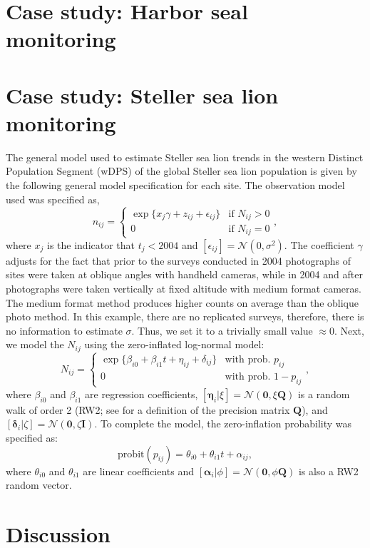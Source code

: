 \documentclass[12pt,letter]{article}
\newcommand{\Nij}{\ensuremath{N_{ij}}}
\newcommand{\fN}{\ensuremath{\mathcal{N}}}
\begin{document}
 


\section{Case study: Harbor seal monitoring}

\section{Case study: Steller sea lion monitoring}

The general model used to estimate Steller sea lion trends in the western Distinct Population Segment (wDPS) of the global Steller sea lion population is given by the following general model specification for each site. The observation model used was specified as,
\begin{equation}
n_{ij} = \left\{
	\begin{array}{ll} 
	\exp\{x_j \gamma + z_{ij} + \epsilon_{ij}\}& \mbox{if } N_{ij}>0\\
	0 & \mbox{if } N_{ij}=0
	\end{array}\right.,
\end{equation}
where $x_j$ is the indicator that $t_j < 2004$ and $[\epsilon_{ij}]=\fN(0,\sigma^2)$. The coefficient $\gamma$ adjusts for the fact that prior to the surveys conducted in 2004 photographs of sites were taken at oblique angles with handheld cameras, while in 2004 and after photographs were taken vertically at fixed altitude with medium format cameras. The medium format method produces higher counts on average than the oblique photo method. In this example, there are no replicated surveys, therefore, there is no information to estimate $\sigma$. Thus, we set it to a trivially small value $\approx 0$. Next, we model the $\Nij$ using the zero-inflated log-normal model:
\begin{equation}
N_{ij} = \left\{
	\begin{array}{ll}
		\exp\{\beta_{i0} + \beta_{i1}t + \eta_{ij} + \delta_{ij}\} & \mbox{with prob. } p_{ij}\\
		0 & \mbox{with prob. } 1-p_{ij}
	\end{array}\right.,
\end{equation}
where $\beta_{i0}$ and $\beta_{i1}$ are regression coefficients, $[\boldsymbol{\eta}_i|\xi] = \fN(\mathbf{0},\xi\mathbf{Q})$ is a random walk of order 2 (RW2; see \citealt{} for a definition of the precision matrix $\mathbf{Q}$), and $[\boldsymbol{\delta}_i|\zeta] = \fN(\mathbf{0},\zeta\mathbf{I})$. 
To complete the model, the zero-inflation probability was specified as:
\begin{equation}
\mbox{probit}(p_{ij}) = \theta_{i0} + \theta_{i1}t + \alpha_{ij},
\end{equation}
where $\theta_{i0}$ and $\theta_{i1}$ are linear coefficients and $[\boldsymbol{\alpha}_i|\phi] = \fN(\mathbf{0},\phi\mathbf{Q})$ is also a RW2 random vector. 



\section{Discussion}

\nocite{*}


\end{document}

